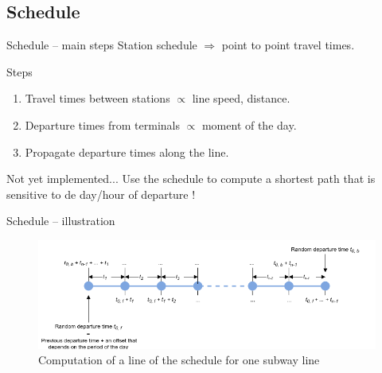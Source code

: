 \subsection{Schedule}
\begin{frame}{Schedule -- main steps}
	Station schedule $\Rightarrow$ point to point travel times.
	\begin{block}{Steps}
		\begin{enumerate}
		\item Travel times between stations $\propto$ line speed, distance.
		\item Departure times from terminals $\propto$ moment of the day.
		\item Propagate departure times along the line.
		\end{enumerate}
	\end{block} 
	\begin{alertblock}{Not yet implemented...}
		Use the schedule to compute a shortest path that is sensitive to de day/hour of departure !
	\end{alertblock}
\end{frame}
\begin{frame}{Schedule --  illustration}
	\begin{figure}
		\centering
		\includegraphics[width=\linewidth]{images/schedule.png}
		\caption{Computation of a line of the schedule for one subway line}
	\end{figure}
\end{frame}
